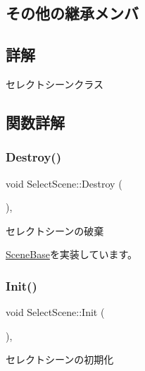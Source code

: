 \subsection*{その他の継承メンバ}


\subsection{詳解}
セレクトシーンクラス 

\subsection{関数詳解}
\mbox{\label{class_select_scene_a938293516c0e1ae5bb09dbab81bc78d9}} 
\subsubsection{\texorpdfstring{Destroy()}{Destroy()}}
{\footnotesize\ttfamily void Select\+Scene\+::\+Destroy (\begin{DoxyParamCaption}{ }\end{DoxyParamCaption})\hspace{0.3cm}{\ttfamily [final]}, {\ttfamily [virtual]}}



セレクトシーンの破棄 



\mbox{\hyperlink{class_scene_base_a7c5b54020bc519b4dadfe9770d6b27f7}{Scene\+Base}}を実装しています。

\mbox{\label{class_select_scene_a20b3a902b5521d7494ed353731b3065d}} 
\subsubsection{\texorpdfstring{Init()}{Init()}}
{\footnotesize\ttfamily void Select\+Scene\+::\+Init (\begin{DoxyParamCaption}{ }\end{DoxyParamCaption})\hspace{0.3cm}{\ttfamily [final]}, {\ttfamily [virtual]}}



セレクトシーンの初期化 



